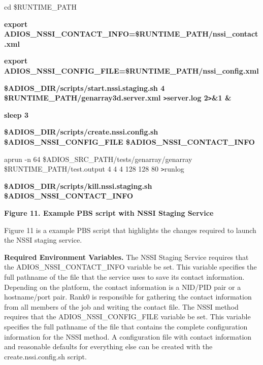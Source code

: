 \vspace{6pt}
{\small cd \$RUNTIME\_PATH}

\vspace{18pt}
{\small \textbf{export ADIOS\_NSSI\_CONTACT\_INFO=\$RUNTIME\_PATH/nssi\_contact.xml}}

\vspace{6pt}
{\small \textbf{export ADIOS\_NSSI\_CONFIG\_FILE=\$RUNTIME\_PATH/nssi\_config.xml}}

\vspace{6pt}
{\small \textbf{\$ADIOS\_DIR/scripts/start.nssi.staging.sh 4 \$RUNTIME\_PATH/genarray3d.server.xml 
\texttt{>}server.log 2\texttt{>}\&1 \&}}

\vspace{6pt}
{\small \textbf{sleep 3}}

\vspace{6pt}
{\small \textbf{\$ADIOS\_DIR/scripts/create.nssi.config.sh \$ADIOS\_NSSI\_CONFIG\_FILE 
\$ADIOS\_NSSI\_CONTACT\_INFO}}

\vspace{18pt}
{\small aprun -n 64 \$ADIOS\_SRC\_PATH/tests/genarray/genarray \$RUNTIME\_PATH/test.output 
4 4 4 128 128 80 \texttt{>}runlog}

\vspace{18pt}
{\small \textbf{\$ADIOS\_DIR/scripts/kill.nssi.staging.sh \$ADIOS\_NSSI\_CONTACT\_INFO}}

\label{HRef140733157}\label{HToc144350170}

\vspace{18pt}
\leftskip=18pt
{\color{color20} \textbf{Figure 11. Example PBS script with NSSI Staging Service}}

\vspace{6pt}
\leftskip=0pt
Figure 11 is a example PBS script that highlights the changes required to launch 
the NSSI staging service.

\vspace{6pt}
\textbf{Required Environment Variables.}  The NSSI Staging Service requires that 
the ADIOS\_NSSI\_CONTACT\_INFO variable be set.  This variable specifies the full 
pathname of the file that the service uses to save its contact information.  Depending 
on the platform, the contact information is a NID/PID pair or a hostname/port pair. 
 Rank0 is responsible for gathering the contact information from all members of 
the job and writing the contact file.  The NSSI method requires that the ADIOS\_NSSI\_CONFIG\_FILE 
variable be set.  This variable specifies the full pathname of the file that contains 
the complete configuration information for the NSSI method.  A configuration file 
with contact information and reasonable defaults for everything else can be created 
with the create.nssi.config.sh script.

